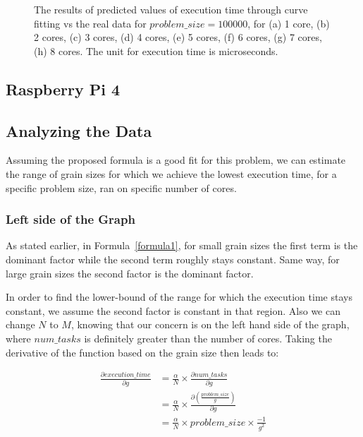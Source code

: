 \begin{figure}[H]
{		\label{fig50:h}}\hfill
	\caption{The results of predicted values of execution time through curve fitting vs the real data for $problem\_size=100000$, for (a) 1 core, (b) 2 cores, (c) 3 cores, (d) 4 cores, (e) 5 cores, (f) 6 cores, (g) 7 cores, (h) 8 cores. The unit for execution time is microseconds.}
	\label{fig50}	
\end{figure}

\subsection{Raspberry Pi 4}


\vspace{\baselineskip}
\subsection{Analyzing the Data}
Assuming the proposed formula is a good fit for this problem, we can estimate the range of grain sizes for which we achieve the lowest execution time, for a specific problem size, ran on specific number of cores.

\vspace{\baselineskip}
\subsubsection{Left side of the Graph}
As stated earlier, in Formula~\ref{formula1}, for small grain sizes the first term is the dominant factor while the second term roughly stays constant. Same way, for large grain sizes the second factor is the dominant factor. 

In order to find the lower-bound of the range for which the execution time stays constant, we assume the second factor is constant in that region. Also we can change $N$ to $M$, knowing that our concern is on the left hand side of the graph, where $num\_{tasks}$ is definitely greater than the number of cores. 
Taking the derivative of the function based on the grain size then leads to:

 
\begin{equation}\label{formula3}
\begin{aligned}
\frac{\partial execution\_{time}}{\partial g} &= \frac{\alpha}{N}\times{\frac{\partial num\_{tasks}}{\partial g}}\\
&=\frac{\alpha}{N}\times\frac{\partial(\frac{problem\_{size}}{g})}{\partial g} \\
&=\frac{\alpha}{N}\times{problem\_{size}}\times{\frac{-1}{g^2}}
\end{aligned}
\end{equation}

